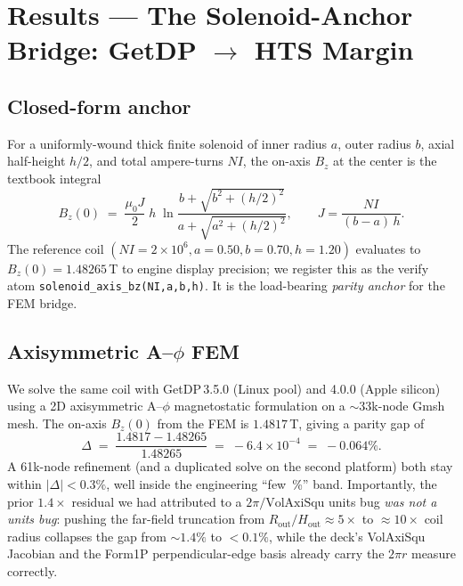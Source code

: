 \documentclass[11pt,a4paper]{article}
\begin{document}
\section{Results --- The Solenoid-Anchor Bridge: GetDP $\to$ HTS Margin}
\label{sec:bridge}

\subsection{Closed-form anchor}

For a uniformly-wound thick finite solenoid of inner radius $a$,
outer radius $b$, axial half-height $h/2$, and total ampere-turns
$NI$, the on-axis $B_z$ at the center is the textbook integral
\begin{equation}
B_z(0) \;=\; \frac{\mu_0 J}{2}\;h\;\ln\!\frac{b + \sqrt{b^{2} + (h/2)^{2}}}{a + \sqrt{a^{2} + (h/2)^{2}}},
\qquad J = \frac{NI}{(b-a)\,h}.
\label{eq:solenoid}
\end{equation}
The reference coil $(NI=2\!\times\!10^{6}, a=0.50, b=0.70, h=1.20)$
evaluates to $B_z(0) = 1.48265$\,T to engine display precision; we
register this as the verify atom
\verb|solenoid_axis_bz(NI,a,b,h)|. It is the load-bearing
\emph{parity anchor} for the FEM bridge.

\subsection{Axisymmetric A--$\phi$ FEM}

We solve the same coil with GetDP\,3.5.0 (Linux pool) and 4.0.0
(Apple silicon) using a 2D axisymmetric A--$\phi$ magnetostatic
formulation on a $\sim$33k-node Gmsh mesh. The on-axis $B_z(0)$ from
the FEM is $1.4817$\,T, giving a parity gap of
\begin{equation}
\Delta \;=\; \frac{1.4817 - 1.48265}{1.48265} \;=\; -6.4\!\times\!10^{-4}
\;=\; -0.064\%.
\end{equation}
A 61k-node refinement (and a duplicated solve on the second
platform) both stay within $|\Delta|<0.3\%$, well inside the
engineering ``few~\%'' band. Importantly, the prior $1.4\times$
residual we had attributed to a $2\pi/\text{VolAxiSqu}$ units bug
\emph{was not a units bug}: pushing the far-field truncation from
$R_{\text{out}}/H_{\text{out}}\approx 5\!\times\!$ to
$\approx 10\!\times\!$ coil radius collapses the gap from $\sim 1.4\%$ to
$<\!0.1\%$, while the deck's VolAxiSqu Jacobian and the Form1P
perpendicular-edge basis already carry the $2\pi r$ measure
correctly.
\end{document}
